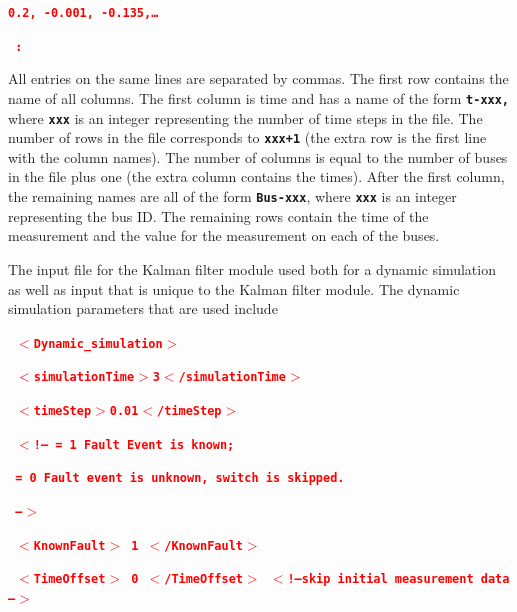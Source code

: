 \documentclass[12pt]{report} %
\begin{document}
\textcolor{red}{\texttt{\textbf{0.2,    -0.001, -0.135,{\dots}}}}

\textcolor{red}{\texttt{\textbf{ :}}}

All entries on the same lines are separated by commas. The first row contains the name of all columns. The first column is time and has a name of the form \texttt{\textbf{t-xxx,}} where \texttt{\textbf{xxx}} is an integer representing the number of time steps in the file. The number of rows in the file corresponds to \texttt{\textbf{xxx+1}} (the extra row is the first line with the column names). The number of columns is equal to the number of buses in the file plus one (the extra column contains the times). After the first column, the remaining names are all of the form \texttt{\textbf{Bus-xxx}}, where \texttt{\textbf{xxx}} is an integer representing the bus ID. The remaining rows contain the time of the measurement and the value for the measurement on each of the buses.

The input file for the Kalman filter module used both for a dynamic simulation as well as input that is unique to the Kalman filter module. The dynamic simulation parameters that are used include

\textcolor{red}{\texttt{\textbf{  $\boldsymbol{\mathrm{<}}$Dynamic\_simulation$\boldsymbol{\mathrm{>}}$}}}

\textcolor{red}{\texttt{\textbf{    $\boldsymbol{\mathrm{<}}$simulationTime$\boldsymbol{\mathrm{>}}$3$\boldsymbol{\mathrm{<}}$/simulationTime$\boldsymbol{\mathrm{>}}$}}}

\textcolor{red}{\texttt{\textbf{    $\boldsymbol{\mathrm{<}}$timeStep$\boldsymbol{\mathrm{>}}$0.01$\boldsymbol{\mathrm{<}}$/timeStep$\boldsymbol{\mathrm{>}}$}}}

\textcolor{red}{\texttt{\textbf{    $\boldsymbol{\mathrm{<}}$!-- = 1 Fault Event is known; }}}

\textcolor{red}{\texttt{\textbf{         = 0 Fault event is unknown, switch is skipped. }}}

\textcolor{red}{\texttt{\textbf{    --$\boldsymbol{\mathrm{>}}$}}}

\textcolor{red}{\texttt{\textbf{    $\boldsymbol{\mathrm{<}}$KnownFault$\boldsymbol{\mathrm{>}}$ 1 $\boldsymbol{\mathrm{<}}$/KnownFault$\boldsymbol{\mathrm{>}}$}}}

\textcolor{red}{\texttt{\textbf{    $\boldsymbol{\mathrm{<}}$TimeOffset$\boldsymbol{\mathrm{>}}$ 0 $\boldsymbol{\mathrm{<}}$/TimeOffset$\boldsymbol{\mathrm{>}}$ $\boldsymbol{\mathrm{<}}$!--skip initial measurement data --$\boldsymbol{\mathrm{>}}$}}}
\end{document}
